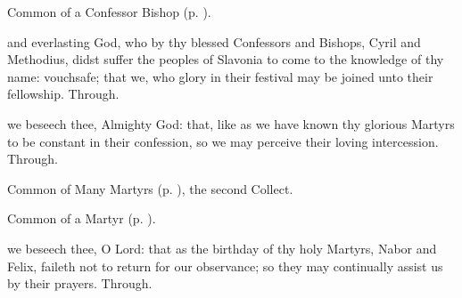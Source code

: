 

\begin{rubric}
	Common of a Confessor Bishop (p. \pageref{CommonConfessorBishop}).
\end{rubric}

{} and everlasting God, who by thy blessed Confessors and Bishops, Cyril and Methodius, didst suffer the peoples of Slavonia to come to the knowledge of thy name: vouchsafe; that we, who glory in their festival may be joined unto their fellowship. Through.



\memorialCollect
{} we beseech thee, Almighty God: that, like as we have known thy glorious Martyrs to be constant in their confession, so we may perceive their loving intercession. Through.



\begin{rubric}
	Common of Many Martyrs (p. \pageref{CommonMartyrsNotBishopsCollect}), the second Collect.
\end{rubric}


\clearpage
{}

\begin{rubric}
	Common of a Martyr (p. \pageref{CommonMartyrBishopCollect}).
\end{rubric}



\memorialCollect
{} we beseech thee, O Lord: that as the birthday of thy holy Martyrs, Nabor and Felix, faileth not to return for our observance; so they may continually assist us by their prayers. Through.



